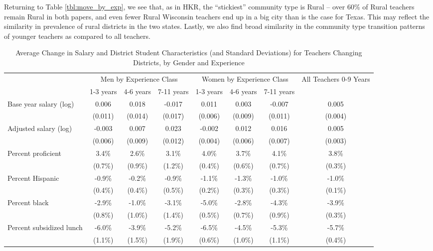 \documentclass[12pt,]{article}
\begin{document}
Returning to Table \ref{tbl:move_by_exp}, we see that, as in HKR, the
``stickiest'' community type is Rural -- over 60\% of Rural teachers
remain Rural in both papers, and even fewer Rural Wisconsin teachers end
up in a big city than is the case for Texas. This may reflect the
similarity in prevalence of rural districts in the two states. Lastly,
we also find broad similarity in the community type transition patterns
of younger teachers as compared to all teachers.

\begin{sidewaystable}[htbp]
\centering
\begin{tabular}{lccccccc}
  \hline
 & \multicolumn{3}{c}{Men by Experience Class} & \multicolumn{3}{c}{Women by Experience Class} & \multirow{2}{*}{\parbox{0.09\linewidth}{All Teachers 0-9 Years}}\\ \cline{2-4} \cline{5-7}
 & 1-3 years & 4-6 years & 7-11 years & 1-3 years & 4-6 years & 7-11 years &  \\ 
  \hline
Base year salary (log) & 0.006 & 0.018 & -0.017 & 0.011 & 0.003 & -0.007 & 0.005 \\ 
   & (0.011) & (0.014) & (0.017) & (0.006) & (0.009) & (0.011) & (0.004) \\ 
  Adjusted salary (log) & -0.003 & 0.007 & 0.023 & -0.002 & 0.012 & 0.016 & 0.005 \\ 
   & (0.006) & (0.009) & (0.012) & (0.004) & (0.006) & (0.007) & (0.003) \\ 
  Percent proficient & 3.4\% & 2.6\% & 3.1\% & 4.0\% & 3.7\% & 4.1\% & 3.8\% \\ 
   & (0.7\%) & (0.9\%) & (1.2\%) & (0.4\%) & (0.6\%) & (0.7\%) & (0.3\%) \\ 
  Percent Hispanic & -0.9\% & -0.2\% & -0.9\% & -1.1\% & -1.3\% & -1.0\% & -1.0\% \\ 
   & (0.4\%) & (0.4\%) & (0.5\%) & (0.2\%) & (0.3\%) & (0.3\%) & (0.1\%) \\ 
  Percent black & -2.9\% & -1.0\% & -3.1\% & -5.0\% & -2.8\% & -4.3\% & -3.9\% \\ 
   & (0.8\%) & (1.0\%) & (1.4\%) & (0.5\%) & (0.7\%) & (0.9\%) & (0.3\%) \\ 
  Percent subsidized lunch & -6.0\% & -3.9\% & -5.2\% & -6.5\% & -4.5\% & -5.3\% & -5.7\% \\ 
   & (1.1\%) & (1.5\%) & (1.9\%) & (0.6\%) & (1.0\%) & (1.1\%) & (0.4\%) \\ 
   \hline
\end{tabular}
\caption{Average Change in Salary and District Student Characteristics (and Standard Deviations) for Teachers Changing Districts, by Gender and Experience} 
\label{tbl:change_by_ge}
\end{sidewaystable}
\end{document}
